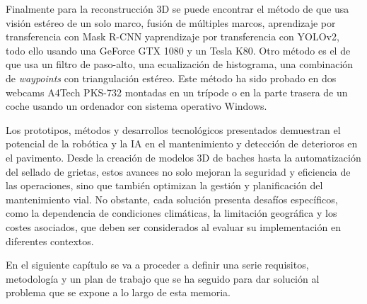 Finalmente para la reconstrucción 3D se puede encontrar el método de \cite{8788687} que usa visión estéreo de un solo marco, fusión de múltiples marcos, aprendizaje por transferencia con Mask R-CNN yaprendizaje por transferencia con YOLOv2, todo ello usando una GeForce GTX 1080 y un Tesla K80. Otro método es el de \cite{8638822} que usa un filtro de paso-alto, una ecualización de histograma, una combinación de \textit{waypoints} con triangulación estéreo. Este método ha sido probado en dos webcams A4Tech PKS-732 montadas en un trípode o en la parte trasera de un coche usando un ordenador con sistema operativo Windows.


Los prototipos, métodos y desarrollos tecnológicos presentados demuestran el potencial de la robótica y la \acs{IA} en el mantenimiento y detección de deterioros en el pavimento. Desde la creación de modelos 3D de baches hasta la automatización del sellado de grietas, estos avances no solo mejoran la seguridad y eficiencia de las operaciones, sino que también optimizan la gestión y planificación del mantenimiento vial. No obstante, cada solución presenta desafíos específicos, como la dependencia de condiciones climáticas, la limitación geográfica y los costes asociados, que deben ser considerados al evaluar su implementación en diferentes contextos. 

En el siguiente capítulo se va a proceder a definir una serie requisitos, metodología y un plan de trabajo que se ha seguido para dar solución al problema que se expone a lo largo de esta memoria.